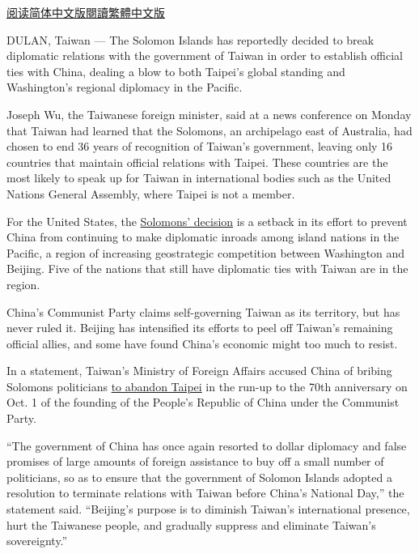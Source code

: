 \href{https://cn.nytimes3xbfgragh.onion/asia-pacific/20190917/solomon-islands-taiwan-china/}{阅读简体中文版}\href{https://cn.nytimes3xbfgragh.onion/asia-pacific/20190917/solomon-islands-taiwan-china/zh-hant/}{閱讀繁體中文版}

DULAN, Taiwan --- The Solomon Islands has reportedly decided to break
diplomatic relations with the government of Taiwan in order to establish
official ties with China, dealing a blow to both Taipei's global
standing and Washington's regional diplomacy in the Pacific.

Joseph Wu, the Taiwanese foreign minister, said at a news conference on
Monday that Taiwan had learned that the Solomons, an archipelago east of
Australia, had chosen to end 36 years of recognition of Taiwan's
government, leaving only 16 countries that maintain official relations
with Taipei. These countries are the most likely to speak up for Taiwan
in international bodies such as the United Nations General Assembly,
where Taipei is not a member.

For the United States, the
\href{https://www.nytimes3xbfgragh.onion/2019/09/05/world/asia/taiwan-solomon-islands.html}{Solomons'
decision} is a setback in its effort to prevent China from continuing to
make diplomatic inroads among island nations in the Pacific, a region of
increasing geostrategic competition between Washington and Beijing. Five
of the nations that still have diplomatic ties with Taiwan are in the
region.

China's Communist Party claims self-governing Taiwan as its territory,
but has never ruled it. Beijing has intensified its efforts to peel off
Taiwan's remaining official allies, and some have found China's economic
might too much to resist.

In a statement, Taiwan's Ministry of Foreign Affairs accused China of
bribing Solomons politicians
\href{https://www.nytimes3xbfgragh.onion/2019/03/20/world/asia/taiwan-south-pacific-tsai-ing-wen-china.html}{to
abandon Taipei} in the run-up to the 70th anniversary on Oct. 1 of the
founding of the People's Republic of China under the Communist Party.

``The government of China has once again resorted to dollar diplomacy
and false promises of large amounts of foreign assistance to buy off a
small number of politicians, so as to ensure that the government of
Solomon Islands adopted a resolution to terminate relations with Taiwan
before China's National Day,'' the statement said. ``Beijing's purpose
is to diminish Taiwan's international presence, hurt the Taiwanese
people, and gradually suppress and eliminate Taiwan's sovereignty.''

